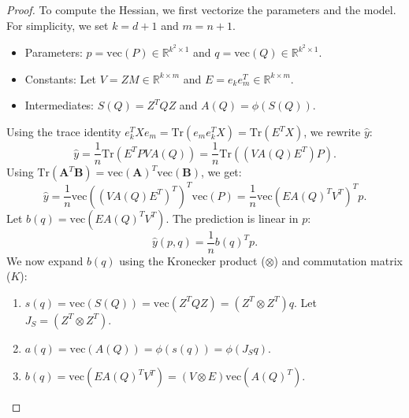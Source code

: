 \documentclass[a4paper,11pt]{article}
\newcommand{\R}{\mathbb{R}}
\newcommand{\1}{\mathbbm{1}}
\theoremstyle{plain}
\newcommand{\vecop}{\mathrm{vec}}
\newcommand{\tr}{\mathrm{Tr}}
\begin{document}
\begin{proof}
To compute the Hessian, we first vectorize the parameters and the model. For simplicity, we set $k=d+1$ and $m=n+1$.
\begin{itemize}
    \item Parameters: $p = \vecop(P) \in \R^{k^2 \times 1}$ and $q = \vecop(Q) \in \R^{k^2 \times 1}$.
    \item Constants: Let $V = Z M \in \R^{k \times m}$ and $E = e_k e_m^T \in \R^{k \times m}$.
    \item Intermediates: $S(Q) = Z^T Q Z$ and $A(Q) = \phi(S(Q))$.
\end{itemize}
Using the trace identity $e_k^T X e_m = \tr(e_m e_k^T X) = \tr(E^T X)$, we rewrite $\hat{y}$:
$$
\hat{y} = \frac{1}{n} \tr(E^T P V A(Q)) = \frac{1}{n} \tr( (V A(Q) E^T) P ).
$$
Using $\tr(\mathbf{A}^T \mathbf{B}) = \text{vec}(\mathbf{A})^T \vecop(\mathbf{B})$, we get:
$$
\hat{y} = \frac{1}{n} \vecop( (V A(Q) E^T)^T )^T \vecop(P) = \frac{1}{n} \vecop(E A(Q)^T V^T)^T p.
$$
Let $b(q) = \vecop(E A(Q)^T V^T)$. The prediction is linear in $p$:
$$
\hat{y}(p, q) = \frac{1}{n} b(q)^T p.
$$
We now expand $b(q)$ using the Kronecker product ($\otimes$) and commutation matrix ($K$):
\begin{enumerate}
    \item $s(q) = \vecop(S(Q)) = \vecop(Z^T Q Z) = (Z^T \otimes Z^T) q$.
    Let $J_S = (Z^T \otimes Z^T)$.

    \item $a(q) = \vecop(A(Q)) = \phi(s(q)) = \phi(J_S q)$.

    \item $b(q) = \vecop(E A(Q)^T V^T) = (V \otimes E) \vecop(A(Q)^T)$.


\end{enumerate}
\end{proof}
\end{document}

